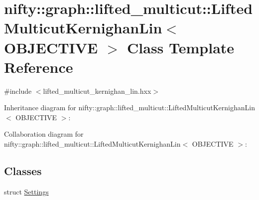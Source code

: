 \hypertarget{classnifty_1_1graph_1_1lifted__multicut_1_1LiftedMulticutKernighanLin}{}\section{nifty\+:\+:graph\+:\+:lifted\+\_\+multicut\+:\+:Lifted\+Multicut\+Kernighan\+Lin$<$ O\+B\+J\+E\+C\+T\+I\+V\+E $>$ Class Template Reference}
\label{classnifty_1_1graph_1_1lifted__multicut_1_1LiftedMulticutKernighanLin}


{\ttfamily \#include $<$lifted\+\_\+multicut\+\_\+kernighan\+\_\+lin.\+hxx$>$}



Inheritance diagram for nifty\+:\+:graph\+:\+:lifted\+\_\+multicut\+:\+:Lifted\+Multicut\+Kernighan\+Lin$<$ O\+B\+J\+E\+C\+T\+I\+V\+E $>$\+:


Collaboration diagram for nifty\+:\+:graph\+:\+:lifted\+\_\+multicut\+:\+:Lifted\+Multicut\+Kernighan\+Lin$<$ O\+B\+J\+E\+C\+T\+I\+V\+E $>$\+:
\subsection*{Classes}
\begin{DoxyCompactItemize}
\item 
struct \hyperlink{structnifty_1_1graph_1_1lifted__multicut_1_1LiftedMulticutKernighanLin_1_1Settings}{Settings}
\end{DoxyCompactItemize}
